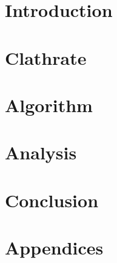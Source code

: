 \section{Introduction}

\section{Clathrate}

\section{Algorithm}

\section{Analysis}

\section{Conclusion}

\section{Appendices}
